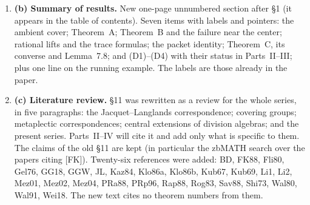 \documentclass[11pt]{article}
\begin{document}
\begin{enumerate}[leftmargin=*]
\item \textbf{(b) Summary of results.}  New one-page unnumbered section
after \S1 (it appears in the table of contents).  Seven items with
labels and pointers: the ambient cover; Theorem~A; Theorem~B and the
failure near the center; rational lifts and the trace formulas; the
packet identity; Theorem~C, its converse and Lemma~7.8; and (D1)--(D4)
with their status in Parts~II--III; plus one line on the running
example.  The labels are those already in the paper.

\item \textbf{(c) Literature review.}  \S11 was rewritten as a review
for the whole series, in five paragraphs: the Jacquet--Langlands
correspondence; covering groups; metaplectic correspondences; central
extensions of division algebras; and the present series.  Parts~II--IV
will cite it and add only what is specific to them.  The claims of the
old \S11 are kept (in particular the zbMATH search over the papers
citing [FK]).  Twenty-six references were added: BD, FK88, Fli80,
Gel76, GG18, GGW, JL, Kaz84, Klo86a, Klo86b, Kub67, Kub69, Li1, Li2,
Mez01, Mez02, Mez04, PRa88, PRp96, Rap88, Rog83, Sav88, Shi73, Wal80,
Wal91, Wei18.  The new text cites no theorem numbers from them.


\end{enumerate}
\end{document}
